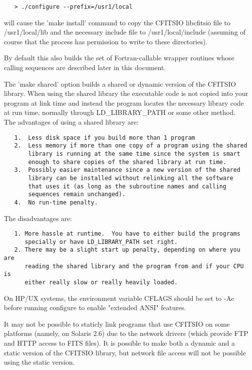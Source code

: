 \documentclass[11pt]{book}
\begin{document}
\begin{verbatim}
   > ./configure --prefix=/usr1/local
\end{verbatim}
will cause the 'make install' command to copy the CFITSIO libcfitsio file
to /usr1/local/lib and the necessary include file to /usr1/local/include
(assuming of course that the process has permission to write to these
directories).

By default this also builds the set of Fortran-callable
wrapper routines whose calling sequences are described later in this
document.

The 'make shared' option builds a shared or dynamic version of the
CFITSIO library.  When using the shared library the executable code is
not copied into your program at link time and instead the program
locates the necessary library code at run time, normally through
LD\_LIBRARY\_PATH or some other method. The advantages of using a shared
library are:

\begin{verbatim}
   1.  Less disk space if you build more than 1 program
   2.  Less memory if more than one copy of a program using the shared
       library is running at the same time since the system is smart
       enough to share copies of the shared library at run time.
   3.  Possibly easier maintenance since a new version of the shared
       library can be installed without relinking all the software
       that uses it (as long as the subroutine names and calling
       sequences remain unchanged).
   4.  No run-time penalty.
\end{verbatim}
The disadvantages are:

\begin{verbatim}
   1. More hassle at runtime.  You have to either build the programs
      specially or have LD_LIBRARY_PATH set right.
   2. There may be a slight start up penalty, depending on where you are
      reading the shared library and the program from and if your CPU is
      either really slow or really heavily loaded.
\end{verbatim}

On HP/UX systems, the environment variable CFLAGS should be set
to -Ae before running configure to enable "extended ANSI" features.

It may not be possible to staticly link programs that use CFITSIO on
some platforms (namely, on Solaris 2.6) due to the network drivers
(which provide FTP and HTTP access to FITS files).  It is possible to
make both a dynamic and a static version of the CFITSIO library, but
network file access will not be possible using the static version.
\end{document}
